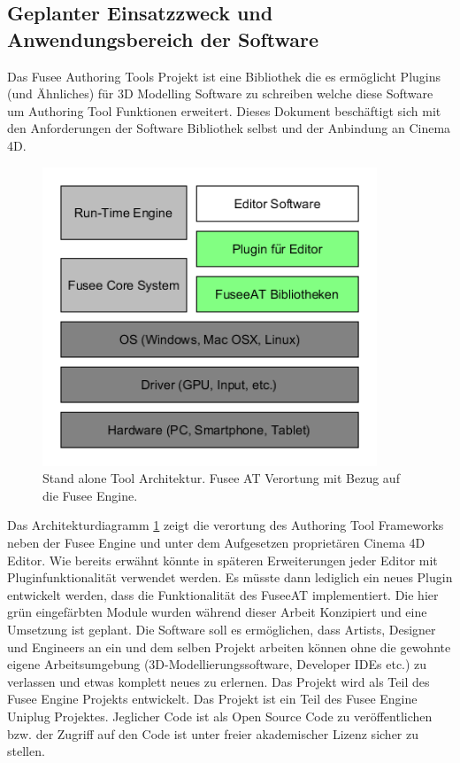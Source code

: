 \documentclass[pagesize, paper=a4, fontsize=12pt, titlepage=true, headings=small, headnosepline, abstractoff, liststotoc, nochapterprefix, plainheadsepline, twoside]{scrreprt}
\begin{document}
\subsection{Geplanter Einsatzzweck und Anwendungsbereich der Software}
Das Fusee Authoring Tools Projekt ist eine Bibliothek die es ermöglicht Plugins (und Ähnliches) für 3D Modelling Software zu schreiben welche diese Software um Authoring Tool Funktionen erweitert. Dieses Dokument beschäftigt sich mit den Anforderungen der Software Bibliothek selbst und der Anbindung an Cinema 4D.

\begin{figure}[ht]
	\centering
	\includegraphics[width=10cm]{Bilder/Engine_Tool_Architektur.png}
	\caption{Stand alone Tool Architektur. Fusee AT Verortung mit Bezug auf die Fusee Engine.}
	\label{FuseeToolBezug}
\end{figure}

Das Architekturdiagramm \ref{FuseeToolBezug} zeigt die verortung des Authoring Tool Frameworks neben der Fusee Engine und unter dem Aufgesetzen proprietären Cinema 4D Editor. Wie bereits erwähnt könnte in späteren Erweiterungen jeder Editor mit Pluginfunktionalität verwendet werden. Es müsste dann lediglich ein neues Plugin entwickelt werden, dass die Funktionalität des FuseeAT implementiert. Die hier grün eingefärbten Module wurden während dieser Arbeit Konzipiert und eine Umsetzung ist geplant.
Die Software soll es ermöglichen, dass Artists, Designer und Engineers an ein und dem selben Projekt arbeiten können ohne die gewohnte eigene Arbeitsumgebung (3D-Modellierungssoftware, Developer IDEs etc.) zu verlassen und etwas komplett neues zu erlernen.
Das Projekt wird als Teil des Fusee Engine Projekts entwickelt. Das Projekt ist ein Teil des Fusee Engine Uniplug Projektes.
Jeglicher Code ist als Open Source Code zu veröffentlichen bzw. der Zugriff auf den Code ist unter freier akademischer Lizenz sicher zu stellen.
\end{document}

